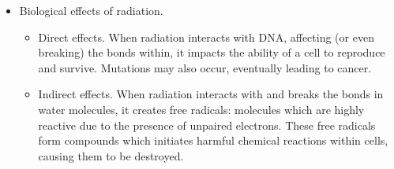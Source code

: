\documentclass[oneside]{book}
\begin{document}
\begin{itemize}
    \item Biological effects of radiation.
    \begin{itemize}
        \item Direct effects. When radiation interacts with DNA, affecting (or even breaking) the bonds within, it impacts the ability of a cell to reproduce and survive. Mutations may also occur, eventually leading to cancer.
        \item Indirect effects. When radiation interacts with and breaks the bonds in water molecules, it creates free radicals: molecules which are highly reactive due to the presence of unpaired electrons. These free radicals form compounds which initiates harmful chemical reactions within cells, causing them to be destroyed.
    \end{itemize}
\end{itemize}
\end{document}
